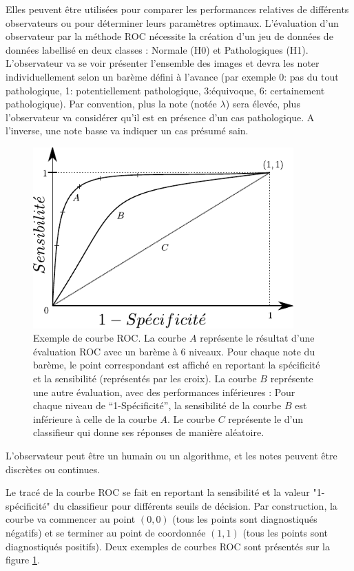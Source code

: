 Elles peuvent être utilisées pour comparer les performances relatives de différents observateurs ou pour déterminer leurs paramètres optimaux. L’évaluation d'un observateur par la méthode ROC nécessite la création d'un jeu de données de données labellisé en deux classes : Normale (H0) et Pathologiques (H1). L'observateur va se voir présenter l'ensemble des images et devra les noter individuellement selon un barème défini à l'avance (par exemple 0: pas du tout pathologique, 1: potentiellement pathologique, 3:équivoque, 6: certainement pathologique). Par convention, plus la note (notée $\lambda$) sera élevée, plus l'observateur va considérer qu'il est en présence d'un cas pathologique. A l'inverse, une note basse va indiquer un cas présumé sain. 


\begin{figure}[h]
	\label{fig:illustrationROC}
	\begin{center}
	\includegraphics[width=10cm]{images/illustrationROC}
	\end{center}
	\caption{Exemple de courbe ROC. La courbe $A$ représente le résultat d'une évaluation ROC avec un barème à 6 niveaux. Pour chaque note du barème, le point correspondant est affiché en reportant la spécificité et la sensibilité (représentés par les croix). La courbe $B$ représente une autre évaluation, avec des performances inférieures : Pour chaque niveau de ``1-Spécificité'', la sensibilité de la courbe $B$ est inférieure à celle de la courbe $A$. Le courbe $C$ représente le d'un classifieur qui donne ses réponses de manière aléatoire.}
\end{figure}

L'observateur peut être un humain ou un algorithme, et les notes peuvent être discrètes ou continues. 

Le tracé de la courbe ROC se fait en reportant la sensibilité et la valeur "1-spécificité" du classifieur pour différents seuils de décision. Par construction, la courbe va commencer au point $(0,0)$ (tous les points sont diagnostiqués négatifs) et se terminer au point de coordonnée $(1,1)$ (tous les points sont diagnostiqués positifs). Deux exemples de courbes ROC sont présentés sur la figure \ref{fig:illustrationROC}.


